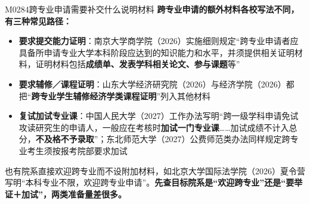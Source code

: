 \begin{qa}{M0284}{跨专业申请需要补交什么说明材料}
\textbf{跨专业申请的额外材料各校写法不同，有三种常见路径：}

\begin{itemize}
  \item \textbf{要求提交能力证明}：南京大学商学院（2026）实施细则规定“跨专业申请者应具备所申请专业大学本科阶段应达到的知识能力和水平，并须提供相关证明材料，证明材料包括\textbf{成绩单、发表学科相关论文、参与课题}等”
  \item \textbf{要求辅修／课程证明}：山东大学经济研究院（2026）与经济学院（2026）都把“\textbf{跨专业学生辅修经济学类课程证明}”列入其他材料
  \item \textbf{复试加试专业课}：中国人民大学（2027）工作办法写明“跨一级学科申请免试攻读研究生的申请人，一般应在考核时\textbf{加试一门专业课}……加试成绩不计入总分，\textbf{不及格不予录取}”；东北师范大学（2027）公费师范类办法同样规定跨专业考生须按报考院部要求加试
\end{itemize}

也有院系直接欢迎跨专业而不设附加材料，如北京大学国际法学院（2026）夏令营写明“本科专业不限，欢迎跨专业申请”。\textbf{先查目标院系是“欢迎跨专业”还是“要举证＋加试”，两类准备量差很多。}
\end{qa}

